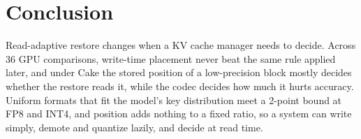 \documentclass[conference]{IEEEtran}
\begin{document}
\section{Conclusion}
Read-adaptive restore changes when a KV cache manager needs to decide.
Across 36 GPU comparisons, write-time placement never beat the same rule applied later, and under Cake the stored position of a low-precision block mostly decides whether the restore reads it, while the codec decides how much it hurts accuracy.
Uniform formats that fit the model's key distribution meet a 2-point bound at FP8 and INT4, and position adds nothing to a fixed ratio, so a system can write simply, demote and quantize lazily, and decide at read time.




\end{document}
